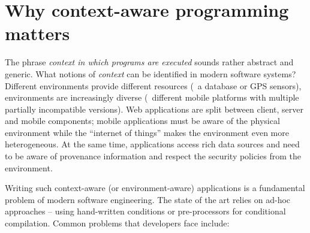 \section{Why context-aware programming matters}
\label{sec:intro-whymatters}

The phrase \emph{context in which programs are executed} sounds rather abstract and generic.
What notions of \emph{context} can be identified in modern software systems?
Different environments provide different resources (\eg~a database or GPS sensors), environments
are increasingly diverse (\eg~different mobile platforms with multiple partially incompatible versions).
Web applications are split between client, server and mobile components; mobile
applications must be aware of the physical environment while the ``internet of things'' makes
the environment even more heterogeneous. At the same time, applications access
rich data sources and need to be aware of provenance information and respect the security policies
from the environment.

Writing such context-aware (or environment-aware) applications is a fundamental problem of modern
software engineering. The state of the art relies on ad-hoc approaches -- using hand-written conditions
or pre-processors for conditional compilation. Common problems that developers face include:


